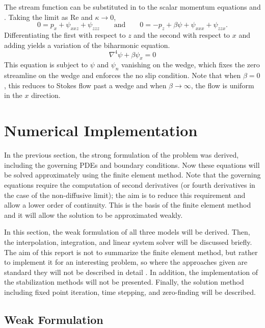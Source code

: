 \documentclass[12pt]{article}
\begin{document}
The stream function can be substituted in to the scalar momentum equations  and . Taking the limit as Re and $\kappa\rightarrow 0 $,
\begin{equation}
0 = p_x + \psi_{xxz} + \psi_{zzz}\qquad\text{and}\qquad0=-p_z+\beta\psi+\psi_{xxx} + \psi_{zzx}.
\end{equation}
Differentiating the first with respect to $z$ and the second with respect to $x$ and adding yields a variation of the biharmonic equation.
\begin{equation}
\label{eq:biharmonic}
\nabla^4\psi+\beta\psi_x=0
\end{equation}
This equation is subject to $\psi$ and $\psi_n$ vanishing on the wedge, which fixes the zero streamline on the wedge and enforces the no slip condition. Note that when $\beta=0$, this reduces to Stokes flow past a wedge and when $\beta\rightarrow\infty$, the flow is uniform in the $x$ direction.

\newpage

\section{Numerical Implementation}

In the previous section, the strong formulation of the problem was derived, including the governing PDEs and boundary conditions. Now these equations will be solved approximately using the finite element method. Note that the governing equations require the computation of second derivatives (or fourth derivatives in the case of the non-diffusive limit); the aim is to reduce this requirement and allow a lower order of continuity. This is the basis of the finite element method and it will allow the solution to be approximated weakly.

In this section, the weak formulation of all three models will be derived. Then, the interpolation, integration, and linear system solver will be discussed briefly. The aim of this report is not to summarize the finite element method, but rather to implement it for an interesting problem, so where the approaches given are standard they will not be described in detail \cite{hughes2012finite} \cite{zienkiewicz1977finite}. In addition, the implementation of the stabilization methods will not be presented. Finally, the solution method including fixed point iteration, time stepping, and zero-finding will be described.

\subsection{Weak Formulation}
\end{document}
